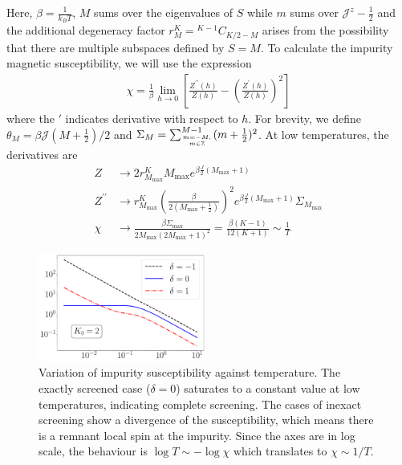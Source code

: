 \documentclass[reprint,prb,superscriptaddress]{revtex4-2}
\begin{document}
Here, \(\beta = \frac{1}{k_B T}\), \(M\) sums over the eigenvalues of \(S\) while \(m\) sums over \({\mathcal{J}}^z - \frac{1}{2}\) and the additional degeneracy factor \(r^K_M= {}^{K-1}C_{K/2 - M}\) arises from the possibility that there are multiple subspaces defined by \(S=M\). 
To calculate the impurity magnetic susceptibility, we will use the expression
\begin{align}
	\chi = \frac{1}{\beta}\lim_{h \to 0}\left[\frac{Z^{\prime\prime}(h)}{Z(h)} - \left(\frac{Z^{\prime}(h)}{Z(h)}\right)^2 \right] 
\end{align}
where the \(\prime\) indicates derivative with respect to \(h\). For brevity, we define \(\theta_M = \beta {\mathcal{J}} (M+\frac{1}{2})/2\) and \(\Sigma_M = \sum_{m=-M, \atop{m\in \mathbb{Z}}}^{M-1}(m+\frac{1}{2})^2\). At low temperatures, the derivatives are 
\begin{align}
	Z &\to 2 r^K_{M_\text{max}} M_\text{max} e^{\beta \frac{J}{2}(M_\text{max} + 1)}\\
	Z^{\prime \prime} &\to r^K_{M_\text{max}}\left(\frac{\beta }{2(M_\text{max} + \frac{1}{2})}\right)^2 e^{\beta \frac{J}{2}(M_\text{max} + 1)}\Sigma_{M_\text{max}}\\
	\chi &\to \frac{\beta\Sigma_\text{max}}{2M_\text{max}\left(2M_\text{max}+1\right)^2} = \frac{\beta(K-1)}{12(K+1)} \sim \frac{1}{T}
\end{align}

\begin{figure}[!htpb]
\centering
\includegraphics[width=0.49\textwidth]{plt/CentralFieldChiPowerlaw.pdf}
\caption{Variation of impurity susceptibility against temperature. The exactly screened case ($\delta=0$) saturates to a constant value at low temperatures, indicating complete screening. The cases of inexact screening show a divergence of the susceptibility, which means there is a remnant local spin at the impurity. Since the axes are in log scale, the behaviour is $\log T \sim -\log \chi$ which translates to $\chi \sim 1/T$.  }
\label{fig:suseptibility_impurity}
\end{figure}
\end{document}
